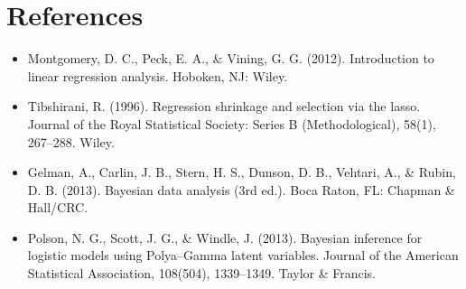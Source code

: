 \documentclass[
  doc,floatsintext]{apa6}
\providecommand{\tightlist}{%
  \setlength{\itemsep}{0pt}\setlength{\parskip}{0pt}}
\begin{document}
\newpage

\section{References}\label{references}

\begin{itemize}
\tightlist
\item
  Montgomery, D. C., Peck, E. A., \& Vining, G. G. (2012). Introduction to linear regression analysis. Hoboken, NJ: Wiley.
\item
  Tibshirani, R. (1996). Regression shrinkage and selection via the lasso. Journal of the Royal Statistical Society: Series B (Methodological), 58(1), 267--288. Wiley.
\item
  Gelman, A., Carlin, J. B., Stern, H. S., Dunson, D. B., Vehtari, A., \& Rubin, D. B. (2013). Bayesian data analysis (3rd ed.). Boca Raton, FL: Chapman \& Hall/CRC.
\item
  Polson, N. G., Scott, J. G., \& Windle, J. (2013). Bayesian inference for logistic models using Polya--Gamma latent variables. Journal of the American Statistical Association, 108(504), 1339--1349. Taylor \& Francis.
\end{itemize}

\newpage
\appendix
\end{document}
